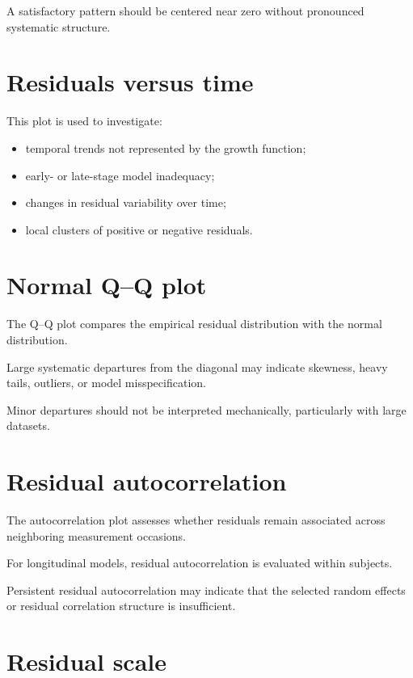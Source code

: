 \documentclass[
  english,
  letterpaper,
  DIV=11,
  numbers=noendperiod]{scrreprt}
\providecommand{\tightlist}{%
  \setlength{\itemsep}{0pt}\setlength{\parskip}{0pt}}
\begin{document}
A satisfactory pattern should be centered near zero without pronounced
systematic structure.

\section{Residuals versus time}\label{residuals-versus-time}

This plot is used to investigate:

\begin{itemize}
\tightlist
\item
  temporal trends not represented by the growth function;
\item
  early- or late-stage model inadequacy;
\item
  changes in residual variability over time;
\item
  local clusters of positive or negative residuals.
\end{itemize}

\section{Normal Q--Q plot}\label{normal-qq-plot}

The Q--Q plot compares the empirical residual distribution with the
normal distribution.

Large systematic departures from the diagonal may indicate skewness,
heavy tails, outliers, or model misspecification.

Minor departures should not be interpreted mechanically, particularly
with large datasets.

\section{Residual autocorrelation}\label{residual-autocorrelation}

The autocorrelation plot assesses whether residuals remain associated
across neighboring measurement occasions.

For longitudinal models, residual autocorrelation is evaluated within
subjects.

Persistent residual autocorrelation may indicate that the selected
random effects or residual correlation structure is insufficient.

\section{Residual scale}\label{residual-scale}
\end{document}
